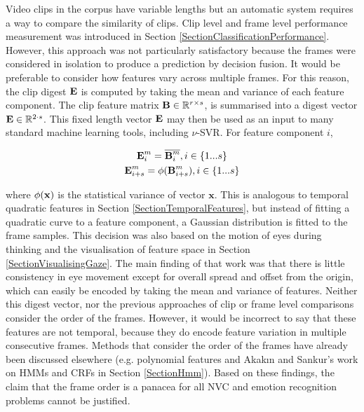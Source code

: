 Video clips in the corpus have variable lengths but an automatic system requires a way to compare the similarity of clips. Clip level and frame level performance measurement was introduced in Section \ref{SectionClassificationPerformance}. However, this approach was not particularly satisfactory because the frames were considered in isolation to produce a prediction by decision fusion. It would be preferable to consider how features vary across multiple frames. For this reason, the clip digest $\textbf{E}$ is computed by taking the mean and variance of each feature component. The clip feature matrix $\textbf{B} \in \mathbb{R}^{r \times s}$, is summarised into a digest vector $\textbf{E} \in \mathbb{R}^{2 \cdot s}$. This fixed length vector $\textbf{E}$ may then be used as an input to many standard machine learning tools, including $\nu$-SVR. For feature component $i$, 

\begin{gather}
 \textbf{E}^{m}_i = \overline{\textbf{B}^{m}_i}, i \in \{1...s\} \\
 \textbf{E}^{m}_{i+s} = \phi(\textbf{B}^{m}_{i+s}), i \in \{1...s\}
\end{gather}

where $\phi(\textbf{x})$ is the statistical variance of vector $\textbf{x}$. This is analogous to temporal quadratic features in Section \ref{SectionTemporalFeatures}, but instead of fitting a quadratic curve to a feature component, a Gaussian distribution is fitted to the frame samples. This decision was also based on the motion of eyes during thinking and the visualisation of feature space in Section \ref{SectionVisualisingGaze}. The main finding of that work was that there is little consistency in eye movement except for overall spread and offset from the origin, which can easily be encoded by taking the mean and variance of features. Neither this digest vector, nor the previous approaches of clip or frame level comparisons consider the order of the frames. However, it would be incorrect to say that these features are not temporal, because they do encode feature variation in multiple consecutive frames. Methods that consider the order of the frames have already been discussed elsewhere (e.g. polynomial features and Akak{\i}n and Sankur's work on \ac{HMM}s and \ac{CRF}s in Section \ref{SectionHmm}). Based on these findings, the claim that the frame order is a panacea for all \ac{NVC} and emotion recognition problems cannot be justified.

